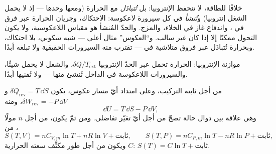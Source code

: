 \begin{remark}\label{rem:b1:second-law-entropy:reading}
خلافًا للطاقة، لا تنحفظ الإنتروبيا: بل \emph{تُتبادَل} مع الحرارة
(ومعها وحدها --- إذ لا يحمل الشغل إنتروبيا) و\emph{تُنشأ} في كل
سيرورة لاعكوسة: الاحتكاك، وجريان الحرارة عبر فرق في ، واندفاع غاز في الخلاء، والمزج. والحدّ المُنشأ هو
مقياس اللاعكوسية، ولا يكون التحول ممكنًا إلا إذا كان
غير سالب. و``العكوس'' مثال أعلى --- شبه سكوني، بلا احتكاك، وبحرارة
تُتبادَل عبر فروق متلاشية في  --- تقترب منه السيرورات
الحقيقية ولا تبلغه أبدًا.
\end{remark}

\begin{omfigure}

{\small موازنة الإنتروبيا: الحرارة تحمل عبر الحدّ الإنتروبيا
$\delta Q/T_{\mathrm{ext}}$، والشغل لا يحمل شيئًا، والسيرورات اللاعكوسة
في الداخل تُنشئ منها --- ولا تُفنيها أبدًا.}
\end{omfigure}

\begin{proposition}\label{prop:b1:second-law-entropy:identity}
من أجل  ثابتة التركيب، وعلى امتداد أيّ مسار عكوس، يكون
$\delta Q_{\mathrm{rev}} = T\,\dd S$ و $\delta W_{\mathrm{rev}} = -P\,\dd V$، ومنه
\[
\dd U = T\,\dd S - P\,\dd V ,
\]
وهي علاقة بين دوال حالة تصحّ من أجل أيّ تغيّر تفاضلي.
ومن ثمّ يكون، من أجل $n$ مولًا من ،
\[
S(T, V) = nC_{V,m}\ln T + nR\ln V + \text{ثابت}, \qquad
S(T, P) = nC_{P,m}\ln T - nR\ln P + \text{ثابت},
\]
ويكون من أجل طور مكثَّف سعته الحرارية $C$: $S(T) = C\ln T + \text{ثابت}$.
\end{proposition}

